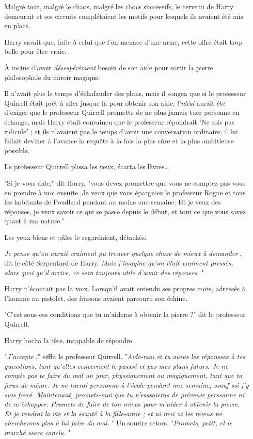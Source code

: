 Malgré tout, malgré le chaos, malgré les chocs successifs, le cerveau de Harry demeurait et ses circuits complétaient les motifs pour lesquels ils avaient été mis en place.

Harry savait que, faite à celui que l'on menace d'une arme, cette offre était trop belle pour être vraie.

À moins d'avoir \emph{désespérément}  besoin de son aide pour sortir la pierre philosophale du miroir magique.

Il n'avait plus le temps d'échafauder des plans, mais il songea que si le professeur Quirrell était prêt à aller jusque là pour obtenir son aide, \emph{l'idéal}  aurait été d'exiger que le professeur Quirrell promette de ne plus jamais tuer personne en échange, mais Harry était convaincu que le professeur répondrait 'Ne sois pas ridicule' ; et ils n'avaient pas le temps d'avoir une conversation ordinaire, il lui fallait deviner à l'avance la requête à la fois la plus sûre et la plus ambitieuse possible.

Le professeur Quirrell plissa les yeux, écarta les lèvres…

"Si je vous aide," dit Harry, "vous devez promettre que vous ne comptez pas vous en prendre à moi ensuite. Je veux que vous épargniez le professeur Rogue et tous les habitants de Poudlard pendant au moins une semaine. Et je veux des réponses, je veux savoir ce qui se passe depuis le début, et tout ce que vous savez quant à ma nature."

Les yeux bleus et pâles le regardaient, détachés.

\emph{Je pense qu'on aurait vraiment pu trouver quelque chose de mieux à demander} , dit le côté Serpentard de Harry. \emph{Mais j'imagine qu'on était vraiment pressés, alors quoi qu'il arrive, ce sera toujours utile d'avoir des réponses.} "

Harry n'écoutait pas la voix. Lorsqu'il avait entendu ses propres mots, adressés à l'homme au pistolet, des frissons avaient parcouru son échine.

"C'est sous ces conditions que tu m'aideras à obtenir la pierre ?" dit le professeur Quirrell.

Harry hocha la tête, incapable de répondre.

"\emph{J'accepte} ," siffla le professeur Quirrell. "\emph{Aide-moi et tu auras les réponsses à tes quesstions, tant qu'elles concernent le passsé et pas mes plans futurs. Je ne compte pas te faire du mal un jour, physsiquement ou magiquement, tant que tu feras de même. Je ne tuerai perssonne à l'école pendant une semaine, ssauf ssi j'y suis forcé. Maintenant, promets-moi que tu n'esssaieras de prévenir perssonne ni de m'échapper. Promets de faire de ton mieux pour m'aider à obtenir la pierre. Et je rendrai la vie et la ssanté à la fille-amie ; et ni moi ni les miens ne chercherons plus à lui faire du mal.} " Un sourire retors. "\emph{Promets, petit, et le marché ssera conclu.} "

